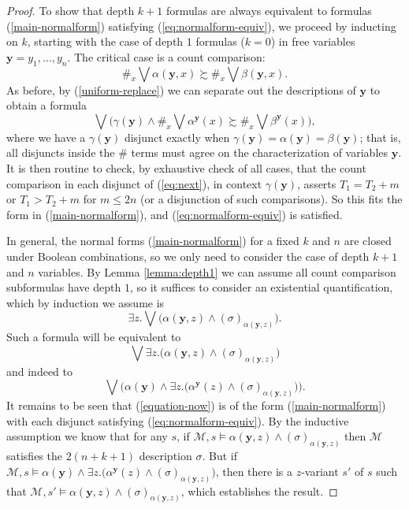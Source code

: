 \documentclass[12pt,oneside,reqno]{amsart}
\theoremstyle{definition}
\begin{document}
\begin{proof}
To show that depth $k+1$ formulas are always equivalent to formulas (\ref{main-normalform}) satisfying (\ref{eq:normalform-equiv}), we proceed by inducting on $k$, starting with the case of depth $1$ formulas ($k=0$) in free variables $\mathbf{y}=y_1,\dots, y_n$. The critical case is a count comparison: $$\#_x \bigvee \alpha(\mathbf{y},x) \succsim \#_x \bigvee \beta(\mathbf{y},x).
$$ As before, by (\ref{uniform-replace}) we can separate out the descriptions of $\mathbf{y}$ to obtain a formula \begin{equation}\bigvee \big(\gamma(\mathbf{y}) \wedge \#_x\bigvee \alpha^{\mathbf{y}}(x) \succsim \#_x\bigvee\beta^{\mathbf{y}}(x) \big),\label{eq:next} \end{equation} where we have a $\gamma(\mathbf{y})$ disjunct exactly when $\gamma(\mathbf{y}) = \alpha(\mathbf{y}) = \beta(\mathbf{y})$; that is, all disjuncts inside the $\#$ terms must agree on the characterization of variables $\mathbf{y}$. It is then routine to check, by exhaustive check of all cases, that the count comparison in each disjunct of (\ref{eq:next}), in context $\gamma(\mathbf{y})$, asserts $T_1 = T_2 +m$ or $T_1 > T_2+m$ for $m\leq 2n$ (or a disjunction of such comparisons). So this fits the form in (\ref{main-normalform}), and (\ref{eq:normalform-equiv}) is satisfied. 

\vspace{0.5ex}

In  general, the normal forms (\ref{main-normalform}) for a fixed $k$ and $n$ are closed under Boolean combinations, so we only need to consider the case of depth $k+1$ and $n$ variables. By Lemma \ref{lemma:depth1} we can assume all count comparison subformulas have depth $1$, so it suffices to consider an existential quantification, which by induction we assume is \begin{equation*} \exists z. \bigvee \big( \alpha(\mathbf{y},z) \wedge (\sigma)_{\alpha(\mathbf{y},z)}\big). \label{ex1} \end{equation*}  Such a formula will be equivalent to $$\bigvee \exists z. \big(\alpha(\mathbf{y},z) \wedge (\sigma)_{\alpha(\mathbf{y},z)}\big)$$ and indeed  to 
\begin{equation}\bigvee \Big(\alpha(\mathbf{y}) \wedge \exists z. \big(\alpha^{\mathbf{y}}(z) \wedge (\sigma)_{\alpha(\mathbf{y},z)}\big)\Big).\label{equation-now} \end{equation} It remains to be seen that (\ref{equation-now}) is of the form (\ref{main-normalform}) with each disjunct satisfying (\ref{eq:normalform-equiv}). 
By the inductive assumption we know that for any $s$, if $\mathcal{M},s \vDash \alpha(\mathbf{y},z) \wedge (\sigma)_{\alpha(\mathbf{y},z)}$ then $\mathcal{M}$ satisfies the $2(n+k+1)$ description $\sigma$. But if $\mathcal{M},s \vDash \alpha(\mathbf{y}) \wedge \exists z. \big(\alpha^{\mathbf{y}}(z) \wedge (\sigma)_{\alpha(\mathbf{y},z)}\big)$, then there is a $z$-variant $s'$ of $s$ such that $\mathcal{M},s' \vDash \alpha(\mathbf{y},z) \wedge (\sigma)_{\alpha(\mathbf{y},z)}$, which establishes the result. 
\end{proof}
\end{document}
